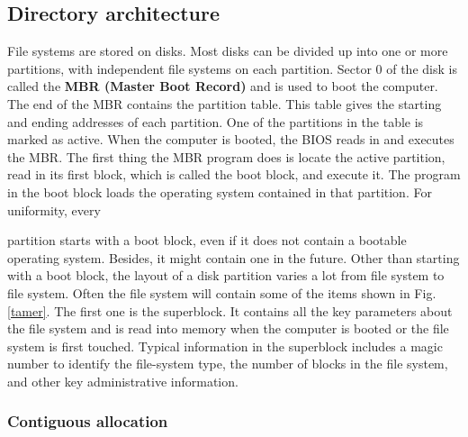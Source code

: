 \subsection{Directory architecture}

File systems are stored on disks. Most disks can be divided up into one or
more partitions, with independent file systems on each partition. Sector 0 of the
disk is called the \textbf{MBR (Master Boot Record)} and is used to boot the computer.
The end of the MBR contains the partition table. This table gives the starting and
ending addresses of each partition. One of the partitions in the table is marked as
active. When the computer is booted, the BIOS reads in and executes the MBR.
The first thing the MBR program does is locate the active partition, read in its first
block, which is called the boot block, and execute it. The program in the boot
block loads the operating system contained in that partition. For uniformity, every

partition starts with a boot block, even if it does not contain a bootable operating
system. Besides, it might contain one in the future.
Other than starting with a boot block, the layout of a disk partition varies a lot
from file system to file system. Often the file system will contain some of the items
shown in Fig. \ref{tamer}. The first one is the superblock. It contains all the key parameters
about the file system and is read into memory when the computer is booted or
the file system is first touched. Typical information in the superblock includes a
magic number to identify the file-system type, the number of blocks in the file system,
and other key administrative information.

\newpage
\subsubsection{Contiguous allocation}


